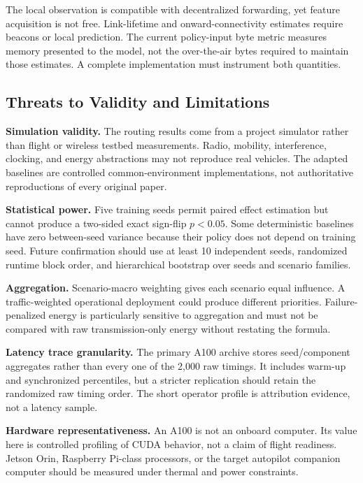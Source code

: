 \documentclass{ieeeaccess}
\begin{document}
The local observation is compatible with decentralized forwarding, yet feature acquisition is not free. Link-lifetime and onward-connectivity estimates require beacons or local prediction. The current policy-input byte metric measures memory presented to the model, not the over-the-air bytes required to maintain those estimates. A complete implementation must instrument both quantities.

\subsection{Threats to Validity and Limitations}

\textbf{Simulation validity.} The routing results come from a project simulator rather than flight or wireless testbed measurements. Radio, mobility, interference, clocking, and energy abstractions may not reproduce real vehicles. The adapted baselines are controlled common-environment implementations, not authoritative reproductions of every original paper.

\textbf{Statistical power.} Five training seeds permit paired effect estimation but cannot produce a two-sided exact sign-flip $p<0.05$. Some deterministic baselines have zero between-seed variance because their policy does not depend on training seed. Future confirmation should use at least 10 independent seeds, randomized runtime block order, and hierarchical bootstrap over seeds and scenario families.

\textbf{Aggregation.} Scenario-macro weighting gives each scenario equal influence. A traffic-weighted operational deployment could produce different priorities. Failure-penalized energy is particularly sensitive to aggregation and must not be compared with raw transmission-only energy without restating the formula.

\textbf{Latency trace granularity.} The primary A100 archive stores seed/component aggregates rather than every one of the 2,000 raw timings. It includes warm-up and synchronized percentiles, but a stricter replication should retain the randomized raw timing order. The short operator profile is attribution evidence, not a latency sample.

\textbf{Hardware representativeness.} An A100 is not an onboard computer. Its value here is controlled profiling of CUDA behavior, not a claim of flight readiness. Jetson Orin, Raspberry Pi-class processors, or the target autopilot companion computer should be measured under thermal and power constraints.
\end{document}
